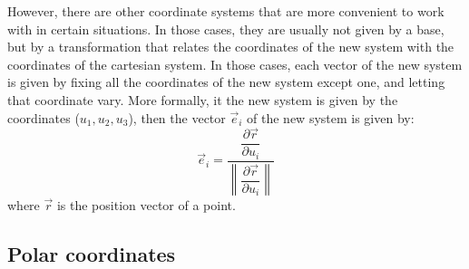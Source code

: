 However, there are other coordinate systems that are more convenient to work with in certain situations. In those cases, they are usually not given by a base, but by a transformation that relates the coordinates of the new system with the coordinates of the cartesian system. In those cases, each vector of the new system is given by fixing all the coordinates of the new system except one, and letting that coordinate vary. More formally, it the new system is given by the coordinates ($u_1, u_2, u_3$), then the vector $\vec{e}_i$ of the new system is given by:
\begin{equation*}
    \vec{e}_i = \dfrac{\dfrac{\partial \vec{r}}{\partial u_i}}{\left\|\dfrac{\partial \vec{r}}{\partial u_i}\right\|}
\end{equation*}
where $\vec{r}$ is the position vector of a point.

\subsection{Polar coordinates}

